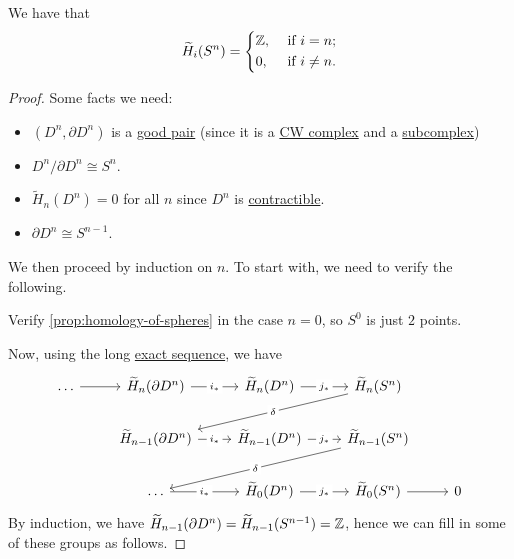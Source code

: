 \begin{proposition}\label{prop:homology-of-spheres}
	We have that
	\[
		\widetilde{H}_i(S^n) = \begin{dcases}
			\mathbb{\MakeUppercase{z}} , & \text{ if } i = n ;    \\
			0,                           & \text{ if } i \neq n .
		\end{dcases}
	\]
\end{proposition}
\begin{proof}
	Some facts we need:
	\begin{itemize}
		\item \((D^n, \partial D^n)\) is a \hyperref[def:good-pair]{good pair} (since it is a \hyperref[def:CW-Complex]{CW complex}
		      and a \hyperref[def:CW-subcomplex]{subcomplex})
		\item \(D^n /\partial D^n \cong S^n\).
		\item \(\widetilde{H}_n(D^n) = 0\) for all \(n\) since \(D^n\) is \hyperref[def:contractible]{contractible}.
		\item \(\partial D^n \cong S^{n - 1}\).
	\end{itemize}
	We then proceed by induction on \(n\). To start with, we need to verify the following.
	\begin{exercise}
		Verify \autoref{prop:homology-of-spheres} in the case \(n = 0\), so \(S^0 \) is just \(2\) points.
	\end{exercise}
	Now, using the long \hyperref[def:exact-sequence]{exact sequence}, we have
	\[
		\begin{tikzcd}
			\ldots & {\widetilde{H}_n(\partial D^n)} & {\widetilde{H}_n(D^n)} & {\widetilde{H}_n(S^n)} \\
			& {\widetilde{H}_{n-1}(\partial D^n)} & {\widetilde{H}_{n-1}(D^n)} & {\widetilde{H}_{n-1}(S^n)} \\
			& \ldots & {\widetilde{H}_{0}(D^n)} & {\widetilde{H}_{0}(S^n)} & 0
			\arrow["{j_\ast}"{description}, from=1-3, to=1-4]
			\arrow["{j_\ast}"{description}, from=2-3, to=2-4]
			\arrow[from=3-4, to=3-5]
			\arrow["{i_\ast}"{description}, from=2-2, to=2-3]
			\arrow["{i_\ast}"{description}, from=1-2, to=1-3]
			\arrow[from=1-1, to=1-2]
			\arrow["\delta"{description}, from=1-4, to=2-2]
			\arrow["\delta"{description}, from=2-4, to=3-2]
			\arrow["{j_\ast}"{description}, from=3-3, to=3-4]
			\arrow["{i_\ast}"{description}, from=3-2, to=3-3]
		\end{tikzcd}
	\]
	By induction, we have \(\widetilde{H} _{n-1}(\partial D^n) = \widetilde{H} _{n-1}(S^{n-1}) = \mathbb{\MakeUppercase{z}} \), hence we can fill in some of these groups as follows.

\end{proof}
